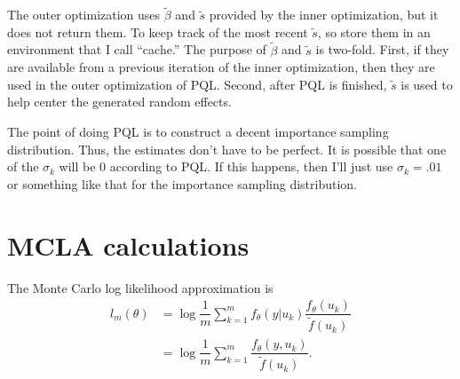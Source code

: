 \documentclass{article}
\begin{document}
The outer optimization  uses $\tilde{\beta}$ and $\tilde{s}$ provided by the inner optimization, but it does not return them. To keep track of the most recent  $\tilde{s}$, so store them in an environment that I call ``cache.''  The purpose of  $\tilde{\beta}$ and $\tilde{s}$ is two-fold. First, if they are available from a previous iteration of the inner optimization, then they are used in the outer optimization of PQL.  Second, after PQL is finished, $\tilde{s}$ is used to help center the generated random effects.


The point of doing PQL is to construct a decent importance sampling distribution. Thus, the estimates don't have to be perfect.  It is possible that one of the $\sigma_k$ will be 0 according to PQL. If this happens, then I'll just use $\sigma_k = .01$ or something like that for the importance sampling distribution.








\appendix
\section{MCLA calculations}
The Monte Carlo log likelihood approximation is
\begin{align}
l_{m}(\theta) &=\log \dfrac{1}{m} \sum_{k=1}^mf_\theta(y|u_k)  \dfrac{ f_\theta(u_k)   }{\tilde{f}(u_k)}\\
&= \log \dfrac{1}{m} \sum_{k=1}^m  \dfrac{ f_\theta(y,u_k)   }{\tilde{f}(u_k)}.
\end{align}
\end{document}
